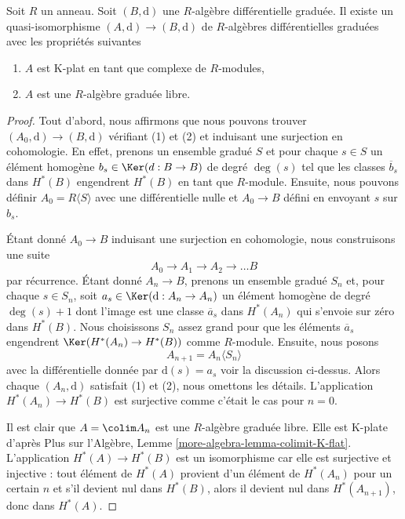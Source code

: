 \begin{lemma}
\label{lemma-K-flat-resolution}
Soit $R$ un anneau. Soit $(B, \text{d})$ une $R$-algèbre différentielle graduée.
Il existe un quasi-isomorphisme $(A, \text{d}) \to (B, \text{d})$ de $R$-algèbres
différentielles graduées avec les propriétés suivantes
\begin{enumerate}
\item $A$ est K-plat en tant que complexe de $R$-modules,
\item $A$ est une $R$-algèbre graduée libre.
\end{enumerate}
\end{lemma}

\begin{proof}
Tout d'abord, nous affirmons que nous pouvons trouver $(A_0, \text{d}) \to (B,
\text{d})$ vérifiant (1) et (2) et induisant une surjection en cohomologie. En effet,
prenons un ensemble gradué $S$ et pour chaque $s \in S$ un élément homogène $b_s
\in \Ker(d : B \to B)$ de degré $\deg(s)$ tel que les classes $\overline{b}_s$
dans $H^*(B)$ engendrent $H^*(B)$ en tant que $R$-module. Ensuite, nous pouvons
définir $A_0 = R\langle S \rangle$ avec une différentielle nulle et $A_0 \to B$ défini
en envoyant $s$ sur $b_s$.

\medskip\noindent
Étant donné $A_0 \to B$ induisant une surjection en cohomologie, nous construisons
une suite
$$
A_0 \to A_1 \to A_2 \to \ldots B
$$
par récurrence. Étant donné $A_n \to B$, prenons un ensemble gradué $S_n$
et, pour chaque $s \in S_n$, soit $a_s \in \Ker(\text{d} : A_n \to A_n)$
un élément homogène de degré $\deg(s) + 1$ dont l'image est une classe
$\overline{a}_s$ dans $H^*(A_n)$ qui s'envoie sur zéro dans $H^*(B)$. Nous
choisissons $S_n$ assez grand pour que les éléments $\overline{a}_s$ engendrent
$\Ker(H^*(A_n) \to H^*(B))$ comme $R$-module. Ensuite, nous posons
$$
A_{n + 1} = A_n\langle S_n \rangle
$$
avec la différentielle donnée par $\text{d}(s) = a_s$ voir la discussion ci-dessus.
Alors chaque $(A_n, \text{d})$ satisfait (1) et (2), nous omettons les détails.
L'application $H^*(A_n) \to H^*(B)$ est surjective comme c'était le cas pour $n =
0$.

\medskip\noindent
Il est clair que $A = \colim A_n$ est une $R$-algèbre graduée libre. Elle est
K-plate d'après Plus sur l'Algèbre, Lemme \ref{more-algebra-lemma-colimit-K-flat}.
L'application $H^*(A) \to H^*(B)$ est un isomorphisme car elle est surjective et
injective : tout élément de $H^*(A)$ provient d'un élément de $H^*(A_n)$ pour un
certain $n$ et s'il devient nul dans $H^*(B)$, alors il devient nul dans $H^*(A_{n
+ 1})$, donc dans $H^*(A)$.
\end{proof}

